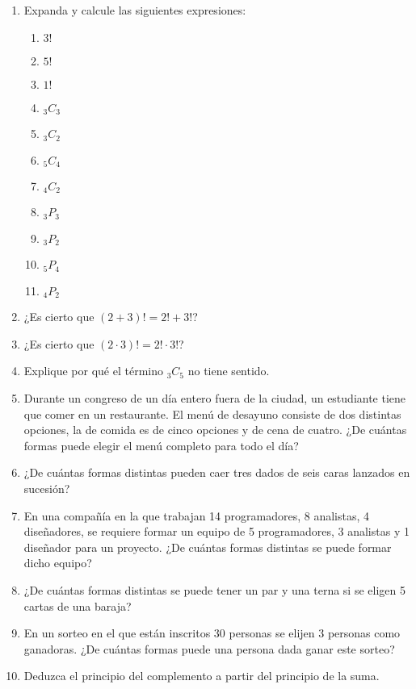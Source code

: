\documentclass[spanish]{report}
\newcommand{\comb}[2]{ {}_{#1}C_{#2}}
\newcommand{\perm}[2]{ {}_{#1}P_{#2}}
\begin{document}
\begin{enumerate}
\item Expanda y calcule las siguientes expresiones:
	\begin{multicols}{4}\begin{enumerate} 
	\item $3!$ \item $5!$ \item $1!$ \item $\comb{3}{3}$ \item $\comb{3}{2}$ \item $\comb{5}{4}$ \item $\comb{4}{2}$ \item $\perm{3}{3}$ \item $\perm{3}{2}$ \item $\perm{5}{4}$ \item $\perm{4}{2}$
	\end{enumerate}\end{multicols}

\item ¿Es cierto que $(2+3)! = 2! + 3!$?
\item ¿Es cierto que $(2 \cdotp 3)! = 2! \cdotp 3!$?

\item Explique por qué el término $\comb{3}{5}$ no tiene sentido.


\item Durante un congreso de un día entero fuera de la ciudad, un estudiante tiene que comer en un restaurante. El menú de desayuno consiste de dos distintas opciones, la de comida es de cinco opciones y de cena de cuatro. ¿De cuántas formas puede elegir el menú completo para todo el día?

\item ¿De cuántas formas distintas pueden caer tres dados de seis caras lanzados en sucesión?

\item En una compañía en la que trabajan 14 programadores, 8 analistas, 4 diseñadores, se requiere formar un equipo de 5 programadores, 3 analistas y 1 diseñador para un proyecto. ¿De cuántas formas distintas se puede formar dicho equipo? %

\item ¿De cuántas formas distintas se puede tener un par y una terna si se eligen 5 cartas de una baraja?

\item En un sorteo en el que están inscritos 30 personas se elijen 3 personas como ganadoras. ¿De cuántas formas puede una persona dada ganar este sorteo?

\item Deduzca el principio del complemento a partir del principio de la suma.
\end{enumerate}
\end{document}
